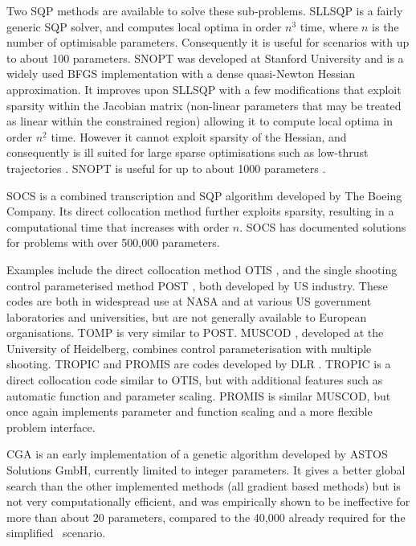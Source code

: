 Two SQP methods are available to solve these sub-problems. SLLSQP is a fairly generic SQP solver, and computes local optima in order $n^{3}$ time, where $n$ is the number of optimisable parameters. Consequently it is useful for scenarios with up to about 100 parameters. SNOPT \parencite[Sparse Nonlinear Optimizer, ][]{Gill1997} was developed at Stanford University and is a widely used BFGS implementation with a dense quasi-Newton Hessian approximation. It improves upon SLLSQP with a few modifications that exploit sparsity within the Jacobian matrix (non-linear parameters that may be treated as linear within the constrained region) allowing it to compute local optima in order $n^{2}$ time. However it cannot exploit sparsity of the Hessian, and consequently is ill suited for large sparse optimisations such as low-thrust trajectories \parencite{Betts2002}. SNOPT is useful for up to about 1000 parameters \parencite{ASTOS_guide}.

SOCS \parencite[Sparse Optimal Control Software, ][]{SOCS_guide} is a combined transcription and SQP algorithm developed by The Boeing Company. Its direct collocation method further exploits sparsity, resulting in a computational time that increases with order $n$. SOCS has documented solutions for problems with over 500,000 parameters.


Examples include the direct collocation method OTIS \parencite[Optimal Trajectories by Implicit Simulation, ][]{Hargraves1987}, and the single shooting control parameterised method POST \parencite[Program to Optimize Simulated Trajectories, ][]{Brauer1977}, both developed by US industry. These codes are both in widespread use at NASA and at various US government laboratories and universities, but are not generally available to European organisations. TOMP \parencite[Trajectory Optimization by Mathematical Programming, ][]{Kraft1994} is very similar to POST. MUSCOD \parencite[Multiple Shooting Code for optimization, ][]{Bock1984}, developed at the University of Heidelberg, combines control parameterisation with multiple shooting. TROPIC and PROMIS are codes developed by DLR \parencite{Jansch1990}. TROPIC is a direct collocation code similar to OTIS, but with additional features such as automatic function and parameter scaling. PROMIS is similar MUSCOD, but once again implements parameter and function scaling and a more flexible problem interface.

CGA \parencite[Constrained Genetic Algorithm, ][]{ASTOS_guide} is an early implementation of a genetic algorithm developed by ASTOS Solutions GmbH, currently limited to integer parameters. It gives a better global search than the other implemented methods (all gradient based methods) but is not very computationally efficient, and was empirically shown to be ineffective for more than about 20 parameters, compared to the 40,000 already required for the simplified \BW\ scenario.


